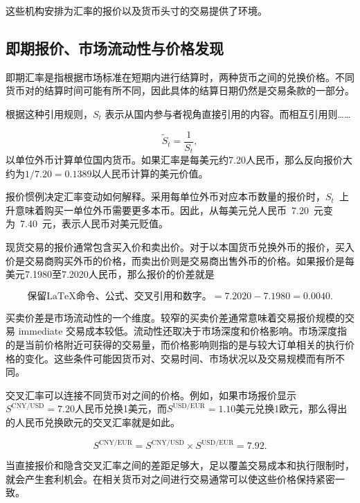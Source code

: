 这些机构安排为汇率的报价以及货币头寸的交易提供了环境。

\subsection{即期报价、市场流动性与价格发现}

即期汇率是指根据市场标准在短期内进行结算时，两种货币之间的兑换价格。不同货币对的结算时间可能有所不同，因此具体的结算日期仍然是交易条款的一部分。

根据这种引用规则，$S_t$ 表示从国内参与者视角直接引用的内容。而相互引用则……

\begin{equation}
\widetilde{S}_t=\frac{1}{S_t},
\label{eq:ch10-reciprocal-quote}
\end{equation}
以单位外币计算单位国内货币。如果汇率是每美元约7.20人民币，那么反向报价大约为$1/7.20=0.1389$以人民币计算的美元价值。

报价惯例决定汇率变动如何解释。采用每单位外币对应本币数量的报价时，$S_t$~上升意味着购买一单位外币需要更多本币。因此，从每美元兑人民币~7.20~元变为~7.40~元，表示人民币对美元贬值。

现货交易的报价通常包含买入价和卖出价。对于以本国货币兑换外币的报价，买入价是交易商购买外币的价格，而卖出价则是交易商出售外币的价格。如果报价是每美元7.1980至7.2020人民币，那么报价的价差就是

\begin{equation*}
\text{保留LaTeX命令、公式、交叉引用和数字。}=7.2020-7.1980=0.0040.
\label{eq:ch10-fx-spread}
\end{equation*}

买卖价差是市场流动性的一个维度。较窄的买卖价差通常意味着交易报价规模的交易 immediate 交易成本较低。流动性还取决于市场深度和价格影响。市场深度指的是当前价格附近可获得的交易量，而价格影响则指的是与较大订单相关的执行价格的变化。这些条件可能因货币对、交易时间、市场状况以及交易规模而有所不同。

交叉汇率可以连接不同货币对之间的价格。例如，如果市场报价显示$S^{\mathrm{CNY/USD}}=7.20$人民币兑换1美元，而$S^{\mathrm{USD/EUR}}=1.10$美元兑换1欧元，那么得出的人民币兑换欧元的交叉汇率就是如此。

\begin{equation*}
S^{\mathrm{CNY/EUR}}
=S^{\mathrm{CNY/USD}}\times
S^{\mathrm{USD/EUR}}
=7.92.
\label{eq:ch10-cross-rate}
\end{equation*}

当直接报价和隐含交叉汇率之间的差距足够大，足以覆盖交易成本和执行限制时，就会产生套利机会。在相关货币对之间进行交易通常可以使这些价格保持紧密一致。

